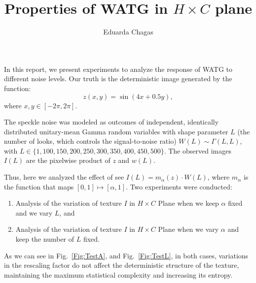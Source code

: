 \documentclass{article}
\title{Properties of WATG in $H \times C$ plane}
\author{Eduarda Chagas}
\begin{document}
\maketitle

In this report, we present experiments to analyze the response of WATG to different noise levels.
Our truth is the deterministic image generated by the function:
\begin{equation*}
z(x,y) = \sin (4x + 0.5y), 
\end{equation*}
where  $x, y \in [-2\pi, 2\pi]$.

The speckle noise was modeled as outcomes of independent, identically distributed unitary-mean Gamma random variables with shape parameter $L$ (the number of looks, which controls the signal-to-noise ratio)
$W(L) \sim \Gamma(L, L)$,
with $L \in \{1, 100, 150, 200, 250, 300, 350, 400, 450, 500\}$.
The observed images $I(L)$ are the pixelwise product of $z$ and $w(L)$.

Thus, here we analyzed the effect of see $I(L) = m_\alpha (z) \cdot W(L)$, where $m_\alpha$ is the function that maps $[0,1]\mapsto [\alpha,1]$.
Two experiments were conducted:
\begin{enumerate}
    \item Analysis of the variation of texture $I$ in $H \times C$ Plane when we keep $\alpha$ fixed and we vary $L$, and
    \item Analysis of the variation of texture $I$ in $H \times C$ Plane when we vary $\alpha$ and keep the number of $L$ fixed.
\end{enumerate}

As we can see in Fig.~\ref{Fig:TestA}, and Fig.~\ref{Fig:TestL}, in both cases, variations in the rescaling factor do not affect the deterministic structure of the texture, maintaining the maximum statistical complexity and increasing its entropy.
\end{document}
